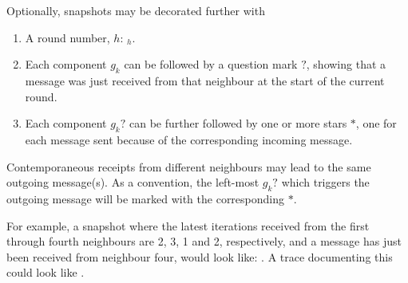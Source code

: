 Optionally, snapshots may be decorated further with 
{\renewcommand{\theenumi}{\alph{enumi}}
\begin{enumerate}
    \item A round number, \(h\): \(_h\).
    \item Each component \(g_k\) can be followed by a question mark \(?\), showing that a message was just received from that neighbour at the start of the current round.
    \item Each component \(g_k?\) can be further followed by one or more stars \(*\), one for each message sent because of the corresponding incoming message.
\end{enumerate}}

Contemporaneous receipts from different neighbours may lead to the same outgoing message(s).  As a convention, the left-most \(g_k?\) which triggers the outgoing message will be marked with the corresponding \(*\).

For example, a snapshot where the latest iterations received from the first through fourth neighbours are 2, 3, 1 and 2, respectively, and a message has just been received from neighbour four, would look like:  .  A trace documenting this could look like  \tarr{} .